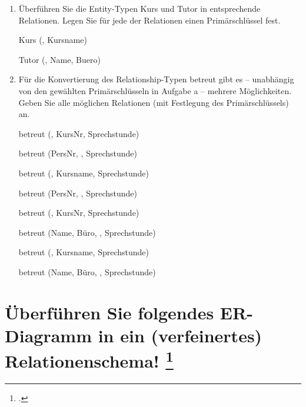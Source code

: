 \documentclass{lehramt-informatik}
\begin{document}
\begin{enumerate}


\item Überführen Sie die Entity-Typen Kurs und Tutor in entsprechende
Relationen. Legen Sie für jede der Relationen einen Primärschlüssel
fest.

\begin{antwort}
\begin{liRmodell}
Kurs (, Kursname)

Tutor (, Name, Buero)
\end{liRmodell}
\end{antwort}


\item Für die Konvertierung des Relationship-Typen betreut gibt es –
unabhängig von den gewählten Primärschlüsseln in Aufgabe a – mehrere
Möglichkeiten. Geben Sie alle möglichen Relationen (mit Festlegung des
Primärschlüssels) an.

\begin{antwort}
\begin{liRmodell}
betreut (, KursNr, Sprechstunde)

betreut (PersNr, , Sprechstunde)

betreut (, Kursname, Sprechstunde)

betreut (PersNr, , Sprechstunde)

betreut (, KursNr, Sprechstunde)

betreut (Name, Büro, , Sprechstunde)

betreut (, Kursname, Sprechstunde)

betreut (Name, Büro, , Sprechstunde)
\end{liRmodell}
\end{antwort}
\end{enumerate}

%

\section{Überführen Sie folgendes ER-Diagramm in ein (verfeinertes) Relationenschema!
\footcite{db:ab:7}}
\end{document}
